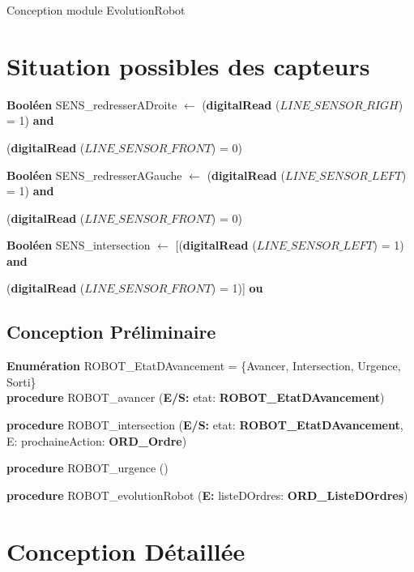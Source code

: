 \documentclass[a4paper, 11pt]{article}
\begin{document}
%
%
\selectfont
\begin{center}
    \Huge{Conception module EvolutionRobot}
\end{center}

\section*{Situation possibles des capteurs}

\textbf{Booléen} SENS\_redresserADroite $\leftarrow$  (\textbf{digitalRead} ($LINE\_SENSOR\_RIGH$) = 1) \textbf{and} 

\indent\indent(\textbf{digitalRead} ($LINE\_SENSOR\_FRONT$) = 0)

\textbf{Booléen} SENS\_redresserAGauche $\leftarrow$  (\textbf{digitalRead} ($LINE\_SENSOR\_LEFT$) = 1) \textbf{and} 

\indent\indent(\textbf{digitalRead} ($LINE\_SENSOR\_FRONT$) = 0)

\textbf{Booléen} SENS\_intersection $\leftarrow$  [(\textbf{digitalRead} ($LINE\_SENSOR\_LEFT$) = 1) \textbf{and} 

\indent\indent(\textbf{digitalRead} ($LINE\_SENSOR\_FRONT$) = 1)] \textbf{ou}

\indent\indent[(\textbf{digitalRead} ($LINE\_SENSOR\_RIGHT$) = 1) \textbf{and}

\indent\indent(\textbf{digitalRead} ($LINE\_SENSOR\_FRONT$) = 1)]

\subsection*{Conception Préliminaire}

\textbf{Enumération} ROBOT\_EtatDAvancement = \{Avancer, Intersection, Urgence, Sorti\}\\

\textbf{procedure} ROBOT\_avancer (\textbf{E/S:} etat: \textbf{ROBOT\_EtatDAvancement})

\textbf{procedure} ROBOT\_intersection (\textbf{E/S:} etat: \textbf{ROBOT\_EtatDAvancement}, {E:} prochaineAction: \textbf{ORD\_Ordre})

\textbf{procedure} ROBOT\_urgence ()

\textbf{procedure} ROBOT\_evolutionRobot (\textbf{E:} listeDOrdres: \textbf{ORD\_ListeDOrdres})

\newpage
\section*{Conception Détaillée}
\end{document}
